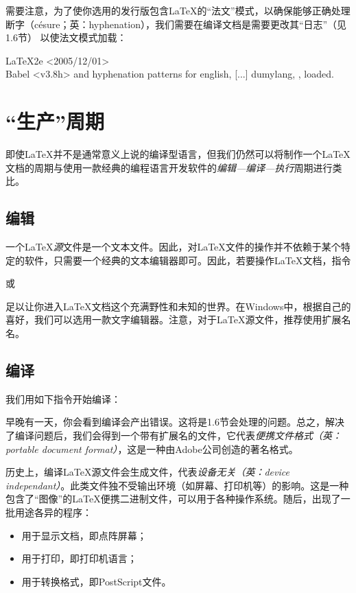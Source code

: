 \begin{exclamation}
    需要注意，为了使你选用的发行版包含\LaTeX 的“法文”模式，以确保能够正确处理断字（césure；英：hyphenation），我们需要在编译文档是需要更改其“日志”（见1.6节）%
    以使法文模式加载：

    \begin{dmd}
    LaTeX2e <2005/12/01>\\
    Babel <v3.8h> and hyphenation patterns for english, [...] dumylang, , loaded.
    \end{dmd}
\end{exclamation}

\section{“生产”周期}

即使\LaTeX 并不是通常意义上说的编译型语言，但我们仍然可以将制作一个\LaTeX 文档的周期与使用一款经典的编程语言开发软件的\textit{编辑—编译—执行}周期进行类比。

\subsection{编辑}

一个\LaTeX \textit{源}文件是一个文本文件。因此，对\LaTeX 文件的操作并不依赖于某个特定的软件，只需要一个经典的文本编辑器即可。因此，若要操作\LaTeX 文档，指令


或


足以让你进入\LaTeX 文档这个充满野性和未知的世界。在Windows中，根据自己的喜好，我们可以选用一款文字编辑器。注意，对于\LaTeX 源文件，推荐使用扩展名名。

\subsection{编译}

我们用如下指令开始编译：


早晚有一天，你会看到编译会产出错误。这将是1.6节会处理的问题。总之，解决了编译问题后，我们会得到一个带有扩展名的文件，它代表\textit{便携文件格式（英：portable document format）}，这是一种由Adobe公司创造的著名格式。

\begin{ii}
    历史上，编译\LaTeX 源文件会生成文件，代表\textit{设备无关（英：device independant）}。此类文件独不受输出环境（如屏幕、打印机等）的影响。这是一种包含了“图像”的\LaTeX 便携二进制文件，可以用于各种操作系统。随后，出现了一批用途各异的程序：
    \begin{itemize}
        \item 用于显示文档，即\rightarrow 点阵屏幕；
        \item 用于打印，即\rightarrow 打印机语言；
        \item 用于转换格式，即\rightarrow PostScript文件。
    \end{itemize}
\end{ii}

